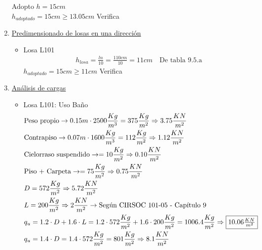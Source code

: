 \begin{enumerate}
Adopto $h = 15cm$ \\
$h_{adoptado} = 15 cm \geq 13.05cm$ Verifica \\

\item \underline{Predimensionado de losas en una dirección}\\

\begin{itemize}
\item Losa L101
\begin{align*}
& h_{losa} = \frac{ln}{10} = \frac{110cm}{10} = 11cm \quad \text{De tabla 9.5.a}
\end{align*}
$h_{adoptado} = 15 cm \geq 11cm$ Verifica \\
\end{itemize}

\item \underline{Análisis de cargas}\\

\begin{itemize}
\item Losa L101: Uso Baño
\begin{align*}
& \text{Peso propio} \rightarrow 0.15m \cdot 2500 \frac{Kg}{m^3} = 375 \frac{Kg}{m^2} \Rightarrow 3.75 \frac{KN}{m^2} \\
& \text{Contrapiso} \rightarrow 0.07m \cdot 1600 \frac{Kg}{m^3} = 112 \frac{Kg}{m^2} \Rightarrow 1.12 \frac{KN}{m^2} \\
& \text{Cielorraso suspendido} \rightarrow  = 10 \frac{Kg}{m^2} \Rightarrow 0.10 \frac{KN}{m^2} \\
& \text{Piso + Carpeta} \rightarrow = 75 \frac{Kg}{m^2} \Rightarrow 0.75 \frac{KN}{m^2} \\
& D = 572 \frac{Kg}{m^2} \Rightarrow 5.72 \frac{KN}{m^2} \\
& L = 200 \frac{Kg}{m^2} \Rightarrow 2 \frac{KN}{m^2} \rightarrow \text{Según CIRSOC 101-05 - Capítulo 9}\\
& q_u = 1.2 \cdot D + 1.6 \cdot L = 1.2 \cdot 572 \frac{Kg}{m^2} + 1.6 \cdot 200 \frac{Kg}{m^2} = 1006.4 \frac{Kg}{m^2} \Rightarrow \framebox{$10.06 \frac{KN}{m^2}$} \\
& q_u = 1.4 \cdot D = 1.4 \cdot 572 \frac{Kg}{m^2} = 801 \frac{Kg}{m^2} \Rightarrow 8.1 \frac{KN}{m^2}
\end{align*}



\end{itemize}
\end{enumerate}
